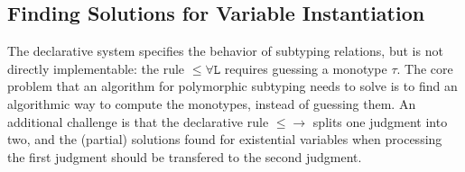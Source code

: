 
\begin{comment}
The conclusions of the declarative subtyping rules do not overlap with
each other, except for the judgments with a shape of
$\forall a. A \le \forall a. B$. In this case, an eager application of
Rule~$\mathtt{{\le}\forall R}$ introduces type variable into the context
earlier, which results in an easier problem than the application of
Rule~$\mathtt{{\le}\forall L}$.
\end{comment}

\subsection{Finding Solutions for Variable Instantiation}

The declarative system specifies the behavior of subtyping relations,
but is not directly implementable: the rule $\mathtt{{\le}\forall L}$
requires guessing a monotype $\tau$.
The core problem that an algorithm for polymorphic 
subtyping needs to solve is to find an algorithmic way to compute the 
monotypes, instead of guessing them. An additional challenge is that
the declarative rule $\mathtt{{\le}{\to}}$ splits one judgment
into two, and the (partial) solutions found for existential variables when
processing the first judgment should be transfered to the second judgment.

